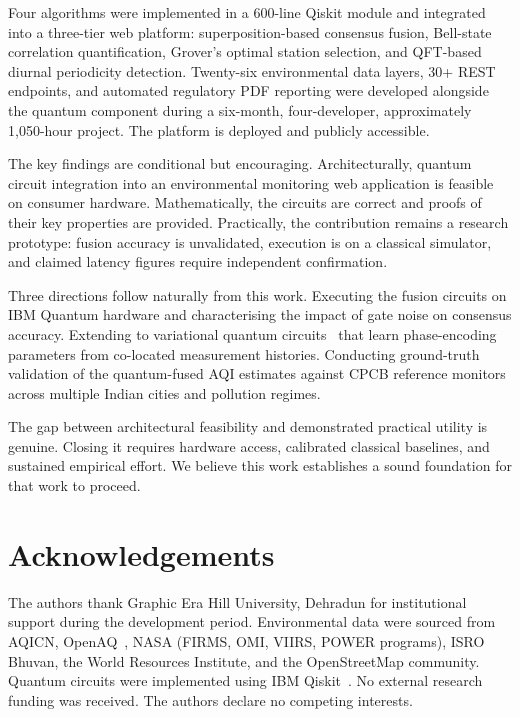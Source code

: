 \documentclass[conference]{IEEEtran}
\begin{document}
Four algorithms were implemented in a 600-line Qiskit module and
integrated into a three-tier web platform: superposition-based consensus
fusion, Bell-state correlation quantification, Grover's optimal station
selection, and QFT-based diurnal periodicity detection.
Twenty-six environmental data layers, 30+ REST endpoints, and
automated regulatory PDF reporting were developed alongside the
quantum component during a six-month, four-developer,
approximately 1,050-hour project.
The platform is deployed and publicly accessible.

The key findings are conditional but encouraging.
Architecturally, quantum circuit integration into an environmental
monitoring web application is feasible on consumer hardware.
Mathematically, the circuits are correct and proofs of their key
properties are provided.
Practically, the contribution remains a research prototype: fusion
accuracy is unvalidated, execution is on a classical simulator,
and claimed latency figures require independent confirmation.

Three directions follow naturally from this work.
Executing the fusion circuits on IBM Quantum hardware and characterising
the impact of gate noise on consensus accuracy.
Extending to variational quantum circuits~\cite{cerezo2021variational}
that learn phase-encoding parameters from co-located measurement histories.
Conducting ground-truth validation of the quantum-fused AQI estimates
against CPCB reference monitors across multiple Indian cities and
pollution regimes.

The gap between architectural feasibility and demonstrated practical
utility is genuine.
Closing it requires hardware access, calibrated classical baselines,
and sustained empirical effort.
We believe this work establishes a sound foundation for that work to proceed.

\section*{Acknowledgements}

The authors thank Graphic Era Hill University, Dehradun for
institutional support during the development period.
Environmental data were sourced from AQICN, OpenAQ~\cite{openaq2016},
NASA (FIRMS, OMI, VIIRS, POWER programs), ISRO Bhuvan, the World
Resources Institute, and the OpenStreetMap community.
Quantum circuits were implemented using IBM Qiskit~\cite{javadi2024qiskit}.
No external research funding was received.
The authors declare no competing interests.
\end{document}
